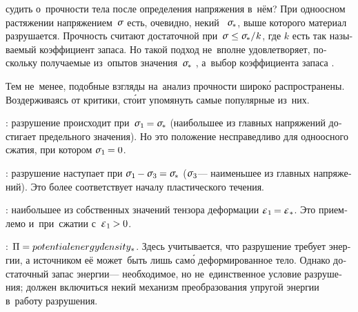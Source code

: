 \begin{otherlanguage}{russian}

 судить о~прочности тела после определения напряжения в~нём?
При одноосном растяжении напряжением~$\mathsigma$ есть, очевидно, некий ~${\tensilestrength}$, выше которого материал разрушается.
Прочность считают достаточной при~${\mathsigma \hspace{.1ex} \leq \tensilestrength / \hspace{.1ex} k}$, где $k$ есть так называемый коэффициент запаса.
Но такой подход не~вполне удовлетворяет, поскольку получаемые из~опытов значения~${\tensilestrength}$ , а~выбор коэффициента запаса .

Тем не~менее, подобные взгляды на~анализ прочности широк\'{о} распространены.
Воздерживаясь от критики, ст\'{о}ит упомянуть самые популярные из~них.


:
разрушение происходит при~${\mathsigma_1 \hspace{-0.15ex} = \tensilestrength}$ (наибольшее из главных напряжений достигает предельного значения).
Но это положение несправедливо для одноосного сжатия, при котором ${\mathsigma_1 \hspace{-0.15ex} = 0}$.

:
разрушение наступает при ${\mathsigma_1 \hspace{-0.15ex} - \mathsigma_3 \hspace{-0.1ex} = \tensilestrength}$ ($\mathsigma_3$\:--- наименьшее из главных напряжений).
Это более соответствует началу пластического течения.

: наибольшее из собственных значений тензора деформации ${\infinitesimaldeformationeigenvalue{1} \hspace{-0.2ex} = \infinitesimaldeformationeigenvalue{*}}$.
Это приемлемо и~при~сжатии с~${\infinitesimaldeformationeigenvalue{1} \hspace{-0.12ex} > 0}$.

:
${\Pi = \\potentialenergydensity_*}$.
Здесь учитывается, что разрушение требует энергии, а источником её может~быть лишь сам\'{о} деформированное тело.
Однако достаточный запас энергии\:--- необходимое, но не~единственное условие разрушения; должен включиться некий механизм преобразования упругой энергии в~работу разрушения.


\end{otherlanguage}
